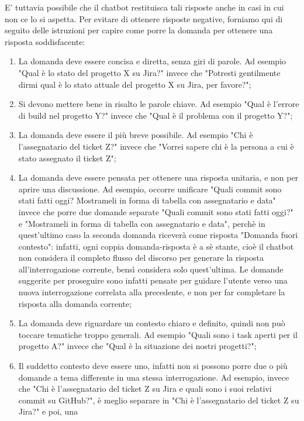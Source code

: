 E' tuttavia possibile che il chatbot restituisca tali risposte anche in casi in cui non ce lo si aspetta.
Per evitare di ottenere risposte negative, forniamo qui di seguito delle istruzioni per capire come porre la domanda per
ottenere una risposta soddisfacente:
\begin{enumerate}
    \item La domanda deve essere concisa e diretta, senza giri di parole. Ad esempio "Qual è lo stato del progetto X su Jira?" invece
    che "Potresti gentilmente dirmi qual è lo stato attuale del progetto X su Jira, per favore?";
    \item Si devono mettere bene in risalto le parole chiave. Ad esempio "Qual è l'errore di build nel progetto Y?" invece che "Qual
    è il problema con il progetto Y?";
    \item La domanda deve essere il più breve possibile. Ad esempio "Chi è l'assegnatario del ticket Z?" invece che "Vorrei sapere
    chi è la persona a cui è stato assegnato il ticket Z";
    \item La domanda deve essere pensata per ottenere una risposta unitaria, e non per aprire una discussione. Ad esempio, occorre
    unificare "Quali commit sono stati fatti oggi? Mostrameli in forma di tabella con assegnatario e data" invece che porre due domande
    separate "Quali commit sono stati fatti oggi?" e "Mostrameli in forma di tabella con assegnatario e data", perchè in quest'ultimo
    caso la seconda domanda riceverà come risposta "Domanda fuori contesto": infatti, ogni coppia domanda-risposta è a sè stante, cioè
    il chatbot non considera il completo flusso del discorso per generare la risposta all'interrogazione corrente, bensì considera solo
    quest'ultima. Le domande suggerite per proseguire sono infatti pensate per guidare l'utente verso una nuova interrogazione correlata alla precedente, e non per far
    completare la risposta alla domanda corrente;
    \item La domanda deve riguardare un contesto chiaro e definito, quindi non può toccare tematiche troppo generali. Ad esempio
    "Quali sono i task aperti per il progetto A?" invece che "Qual è la situazione dei nostri progetti?";
    \item Il suddetto contesto deve essere uno, infatti non si possono porre due o più domande a tema differente in una stessa
    interrogazione. Ad esempio, invece che "Chi è l'assegnatario del ticket Z su Jira
    e quali sono i suoi relativi commit su GitHub?", è meglio separare in "Chi è l'assegnatario del ticket Z su Jira?" e poi, una 

\end{enumerate}
